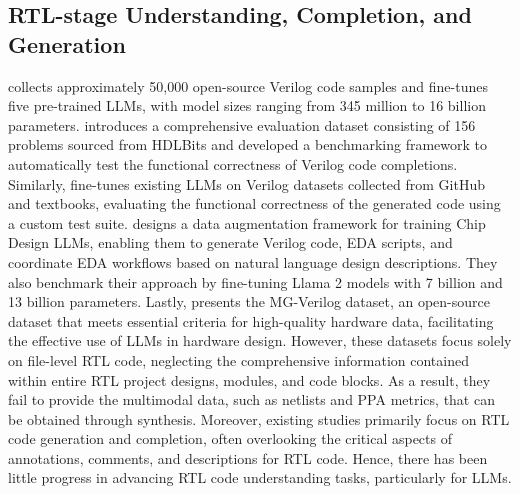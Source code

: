 

\subsection{RTL-stage Understanding, Completion, and Generation}
\cite{thakur2023benchmarking} collects approximately 50,000 open-source Verilog code samples and fine-tunes five pre-trained LLMs, with model sizes ranging from 345 million to 16 billion parameters. \cite{liu2023verilogeval} introduces a comprehensive evaluation dataset consisting of 156 problems sourced from HDLBits and developed a benchmarking framework to automatically test the functional correctness of Verilog code completions. Similarly, \cite{thakur2024verigen} fine-tunes existing LLMs on Verilog datasets collected from GitHub and textbooks, evaluating the functional correctness of the generated code using a custom test suite. \cite{chang2024dataisall} designs a data augmentation framework for training Chip Design LLMs, enabling them to generate Verilog code, EDA scripts, and coordinate EDA workflows based on natural language design descriptions. They also benchmark their approach by fine-tuning Llama 2 models with 7 billion and 13 billion parameters. Lastly, \cite{zhang2024mg} presents the MG-Verilog dataset, an open-source dataset that meets essential criteria for high-quality hardware data, facilitating the effective use of LLMs in hardware design. However, these datasets focus solely on file-level RTL code, neglecting the comprehensive information contained within entire RTL project designs, modules, and code blocks. As a result, they fail to provide the multimodal data, such as netlists and PPA metrics, that can be obtained through synthesis. 
Moreover, existing studies primarily focus on RTL code generation and completion, often overlooking the critical aspects of annotations, comments, and descriptions for RTL code. Hence, there has been little progress in advancing RTL code understanding tasks, particularly for LLMs.

